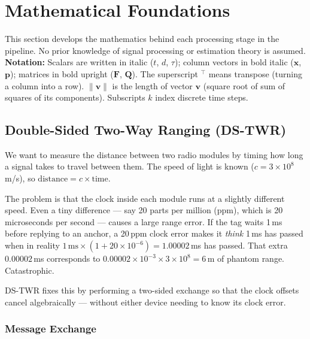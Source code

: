 \documentclass[11pt,a4paper]{article}
\newcommand{\vect}[1]{\bm{#1}}
\newcommand{\mat}[1]{\mathbf{#1}}
\newcommand{\Trans}{^{\top}}
\begin{document}
\section{Mathematical Foundations}

This section develops the mathematics behind each processing stage in the pipeline.
No prior knowledge of signal processing or estimation theory is assumed.
\textbf{Notation:} Scalars are written in italic ($t$, $d$, $\tau$); column vectors in bold italic ($\vect{x}$, $\vect{p}$); matrices in bold upright ($\mat{F}$, $\mat{Q}$). The superscript $\Trans$ means transpose (turning a column into a row). $\|\vect{v}\|$ is the length of vector $\vect{v}$ (square root of sum of squares of its components). Subscripts $k$ index discrete time steps.

\subsection{Double-Sided Two-Way Ranging (DS-TWR)}

\begin{intubox}
We want to measure the distance between two radio modules by timing how long a signal takes to travel between them. The speed of light is known ($c = 3\times10^8$\,m/s), so $\text{distance} = c \times \text{time}$.

The problem is that the clock inside each module runs at a slightly different speed. Even a tiny difference --- say 20 parts per million (ppm), which is 20 microseconds per second --- causes a large range error. If the tag waits 1\,ms before replying to an anchor, a 20\,ppm clock error makes it \emph{think} 1\,ms has passed when in reality $1\,\text{ms} \times (1 + 20\times10^{-6}) = 1.00002$\,ms has passed. That extra $0.00002$\,ms corresponds to $0.00002 \times 10^{-3} \times 3\times10^8 = 6$\,m of phantom range. Catastrophic.

DS-TWR fixes this by performing a two-sided exchange so that the clock offsets cancel algebraically --- without either device needing to know its clock error.
\end{intubox}

\subsubsection{Message Exchange}
\end{document}
